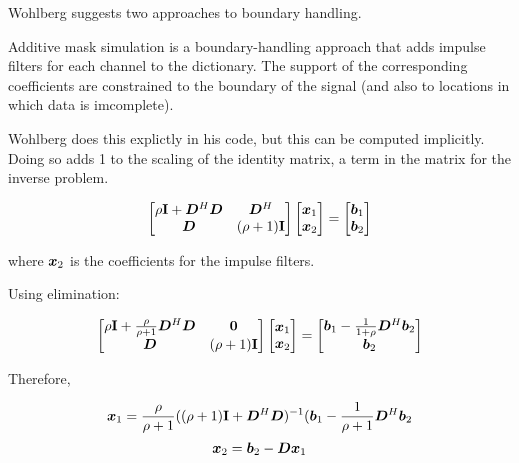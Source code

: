 \documentclass{article}
\begin{document}
Wohlberg suggests two approaches to boundary handling.

Additive mask simulation is a boundary-handling approach that adds impulse filters for each channel to the dictionary.  The support of the corresponding coefficients are constrained to the boundary of the signal (and also to locations in which data is imcomplete).

Wohlberg does this explictly in his code, but this can be computed implicitly. Doing so adds 1 to the scaling of the identity matrix, a term in the matrix for the inverse problem.

\begin{equation}
\begin{bmatrix}
\rho {\bf I} + \bm{D}^H\bm{D} & \bm{D}^H \\
\bm{D} & (\rho + 1){\bf I}
\end{bmatrix}
\begin{bmatrix}
\bm{x}_1 \\
\bm{x}_2
\end{bmatrix}
=
\begin{bmatrix}
\bm{b}_1 \\
\bm{b}_2
\end{bmatrix}
\end{equation}

where $\bm{x}_2$ is the coefficients for the impulse filters.

Using elimination:

\begin{equation}
\begin{bmatrix}
\rho {\bf I} + \frac{\rho}{\rho + 1}\bm{D}^H\bm{D} & \bm{0} \\
\bm{D} & (\rho + 1){\bf I}
\end{bmatrix}
\begin{bmatrix}
\bm{x}_1 \\
\bm{x}_2
\end{bmatrix}
=
\begin{bmatrix}
\bm{b}_1 - \frac{1}{1 + \rho}\bm{D}^H\bm{b}_2 \\
\bm{b}_2
\end{bmatrix}
\end{equation}

Therefore,

\begin{equation}
\bm{x}_1 = \frac{\rho}{\rho + 1}((\rho + 1){\bf I} + \bm{D}^H\bm{D})^{-1}(\bm{b}_1 -\frac{1}{\rho + 1}\bm{D}^H\bm{b}_2
\end{equation}
\begin{equation}
\bm{x}_2 = \bm{b}_2 - \bm{D}\bm{x}_1
\end{equation}
\end{document}
